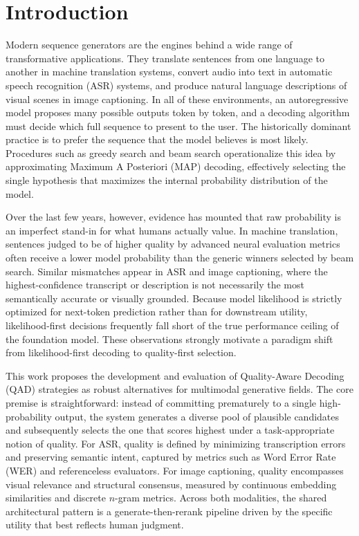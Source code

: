\chapter{Introduction}
\label{sec:intro}

\noindent
Modern sequence generators are the engines behind a wide range of transformative applications. They translate sentences from one language to another in machine translation systems, convert audio into text in automatic speech recognition (ASR) systems, and produce natural language descriptions of visual scenes in image captioning. In all of these environments, an autoregressive model proposes many possible outputs token by token, and a decoding algorithm must decide which full sequence to present to the user. The historically dominant practice is to prefer the sequence that the model believes is most likely. Procedures such as greedy search and beam search operationalize this idea by approximating Maximum A Posteriori (MAP) decoding, effectively selecting the single hypothesis that maximizes the internal probability distribution of the model.

Over the last few years, however, evidence has mounted that raw probability is an imperfect stand-in for what humans actually value. In machine translation, sentences judged to be of higher quality by advanced neural evaluation metrics often receive a lower model probability than the generic winners selected by beam search. Similar mismatches appear in ASR and image captioning, where the highest-confidence transcript or description is not necessarily the most semantically accurate or visually grounded. Because model likelihood is strictly optimized for next-token prediction rather than for downstream utility, likelihood-first decisions frequently fall short of the true performance ceiling of the foundation model. These observations strongly motivate a paradigm shift from likelihood-first decoding to quality-first selection.

This work proposes the development and evaluation of Quality-Aware Decoding (QAD) strategies as robust alternatives for multimodal generative fields. The core premise is straightforward: instead of committing prematurely to a single high-probability output, the system generates a diverse pool of plausible candidates and subsequently selects the one that scores highest under a task-appropriate notion of quality. For ASR, quality is defined by minimizing transcription errors and preserving semantic intent, captured by metrics such as Word Error Rate (WER) and referenceless evaluators. For image captioning, quality encompasses visual relevance and structural consensus, measured by continuous embedding similarities and discrete $n$-gram metrics. Across both modalities, the shared architectural pattern is a generate-then-rerank pipeline driven by the specific utility that best reflects human judgment.

